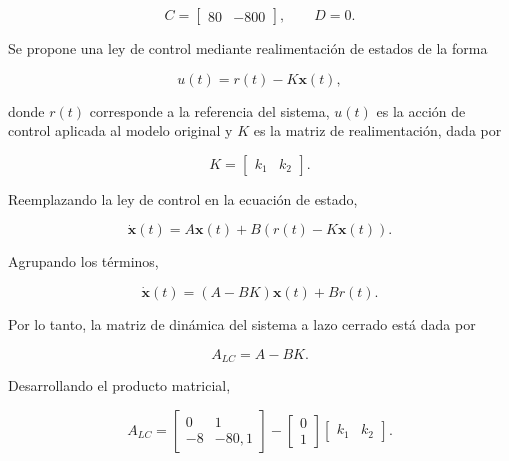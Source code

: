 \documentclass[10pt]{article}
\begin{document}
\begin{equation}
    C=
    \begin{bmatrix}
        80 & -800
    \end{bmatrix},
    \qquad D=0.
\end{equation}

Se propone una ley de control mediante realimentación
de estados de la forma

\begin{equation}
    u(t)=r(t)-K\mathbf{x}(t),
\end{equation}

donde $r(t)$ corresponde a la referencia del sistema,
$u(t)$ es la acción de control aplicada al modelo
original y $K$ es la matriz de realimentación, dada por

\begin{equation}
    K=
    \begin{bmatrix}
        k_1 & k_2
    \end{bmatrix}.
\end{equation}

Reemplazando la ley de control en la ecuación de estado,

\begin{equation}
    \dot{\mathbf{x}}(t)=
    A\mathbf{x}(t)+B(r(t)-K\mathbf{x}(t)).
\end{equation}

Agrupando los términos,

\begin{equation}
    \dot{\mathbf{x}}(t)=
    (A-BK)\mathbf{x}(t)+Br(t).
\end{equation}

Por lo tanto, la matriz de dinámica del sistema a
lazo cerrado está dada por

\begin{equation}
    A_{LC}=A-BK.
\end{equation}

Desarrollando el producto matricial,

\begin{equation}
    A_{LC}=
    \begin{bmatrix}
        0 & 1\\
        -8 & -80{,}1
    \end{bmatrix}
    -
    \begin{bmatrix}
        0\\
        1
    \end{bmatrix}
    \begin{bmatrix}
        k_1 & k_2
    \end{bmatrix}.
\end{equation}
\end{document}

